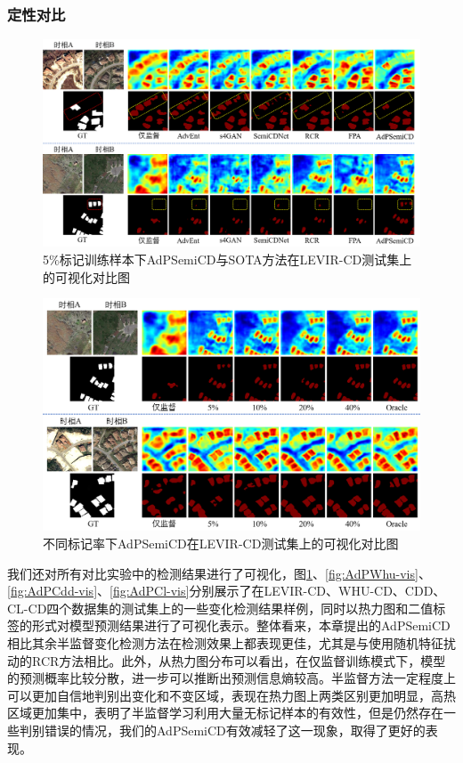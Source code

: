 \documentclass[lang=chs, degree=master, blindreview=false, adobe=false]{yanputhesis}
\begin{document}
\subsubsection{定性对比}
\begin{figure}[!htbp]
  \centering
  \includegraphics[scale=0.45]{images/AdPlevir-vis.png}
  \caption{
    5$\%$标记训练样本下AdPSemiCD与SOTA方法在LEVIR-CD测试集上的可视化对比图
  }
  \label{fig:AdPLevir-vis}
\end{figure}
\begin{figure}[!htbp]
  \centering
  \includegraphics[scale=0.45]{images/AdPdiffSemi.png}
  \caption{
    不同标记率下AdPSemiCD在LEVIR-CD测试集上的可视化对比图
  }
  \label{fig:AdPdiffLEVIR-vis}
\end{figure}
我们还对所有对比实验中的检测结果进行了可视化，图\ref{fig:AdPLevir-vis}、\ref{fig:AdPWhu-vis}、\ref{fig:AdPCdd-vis}、\ref{fig:AdPCl-vis}分别展示了在LEVIR-CD、WHU-CD、CDD、CL-CD四个数据集的测试集上的一些变化检测结果样例，同时以热力图和二值标签的形式对模型预测结果进行了可视化表示。整体看来，本章提出的AdPSemiCD相比其余半监督变化检测方法在检测效果上都表现更佳，尤其是与使用随机特征扰动的RCR方法相比。此外，从热力图分布可以看出，在仅监督训练模式下，模型的预测概率比较分散，进一步可以推断出预测信息熵较高。半监督方法一定程度上可以更加自信地判别出变化和不变区域，表现在热力图上两类区别更加明显，高热区域更加集中，表明了半监督学习利用大量无标记样本的有效性，但是仍然存在一些判别错误的情况，我们的AdPSemiCD有效减轻了这一现象，取得了更好的表现。
\end{document}
